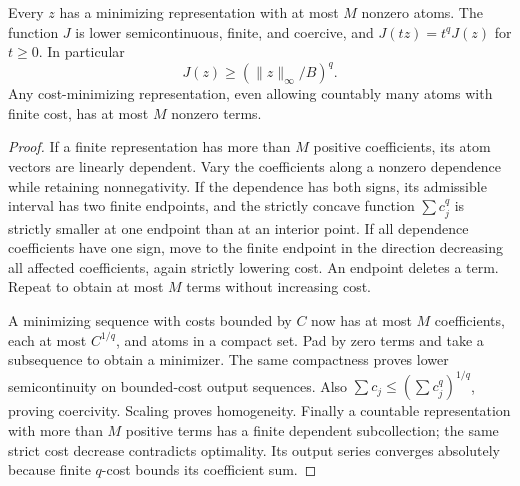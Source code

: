 \documentclass[11pt]{article}
\begin{document}
\begin{lemma}
Every $z$ has a minimizing representation with at most $M$ nonzero
atoms. The function $J$ is lower semicontinuous, finite, and coercive,
and $J(tz)=t^qJ(z)$ for $t\ge0$. In particular
\[
 J(z)\ge(\|z\|_\infty/B)^q.
\]
Any cost-minimizing representation, even allowing countably many atoms
with finite cost, has at most $M$ nonzero terms.
\end{lemma}
\begin{proof}
If a finite representation has more than $M$ positive coefficients,
its atom vectors are linearly dependent. Vary the coefficients along a
nonzero dependence while retaining nonnegativity. If the dependence has
both signs, its admissible interval has two finite endpoints, and the
strictly concave function $\sum c_j^q$ is strictly smaller at one endpoint
than at an interior point. If all dependence coefficients have one sign,
move to the finite endpoint in the direction decreasing all affected
coefficients, again strictly lowering cost. An endpoint deletes a term.
Repeat to obtain at most $M$ terms without increasing cost.

A minimizing sequence with costs bounded by $C$ now has at most $M$
coefficients, each at most $C^{1/q}$, and atoms in a compact set. Pad
by zero terms and take a subsequence to obtain a minimizer. The same
compactness proves lower semicontinuity on bounded-cost output sequences.
Also $\sum c_j\le(\sum c_j^q)^{1/q}$, proving coercivity. Scaling proves
homogeneity. Finally a countable representation with more than $M$
positive terms has a finite dependent subcollection; the same strict
cost decrease contradicts optimality. Its output series converges
absolutely because finite $q$-cost bounds its coefficient sum.
\end{proof}
\end{document}
